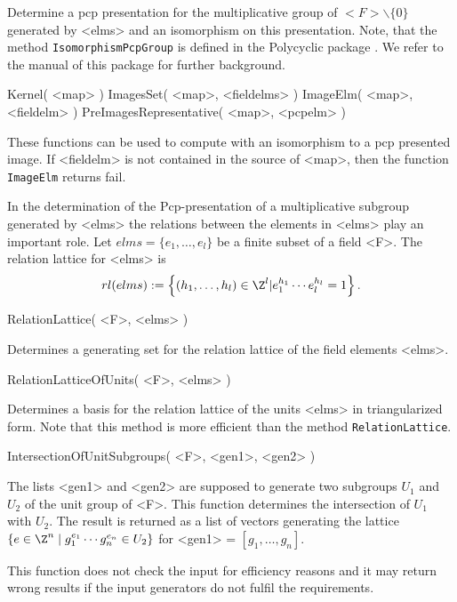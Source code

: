 Determine a pcp presentation for the multiplicative group of
$<F>\backslash\{0\}$ generated by
<elms> and an isomorphism on this presentation. 
Note, that the method {\tt IsomorphismPcpGroup} is defined in the
Polycyclic package \cite{Polycyclic}. We refer to the manual of this
package for further background. 


\> Kernel( <map> )
\> ImagesSet( <map>, <fieldelms> ) 
\> ImageElm( <map>, <fieldelm> )
\> PreImagesRepresentative( <map>, <pcpelm> )

These functions can be used to compute with an isomorphism to a pcp
presented image. If <fieldelm> is not contained in the source of
<map>,
then the function {\tt ImageElm} returns fail.

In the determination of the Pcp-presentation of a multiplicative
subgroup generated by <elms> the relations between the elements in
<elms> play an important role.
Let $elms=\{e_1,\dots,e_l\}$ be a finite subset of a field <F>.
The relation lattice for <elms> is 
$$
rl(elms):=\left\{(h_1,\dots,h_l) \in \Z^l | e_1^{h_1} \cdots
e_l^{h_l} = 1\right\} .
$$

\> RelationLattice( <F>, <elms> )

Determines a generating set 
for the relation lattice of the field elements <elms>.
 

\> RelationLatticeOfUnits( <F>, <elms> )

Determines a basis for the relation lattice of the units <elms> in 
triangularized form. Note that this method is more efficient than 
the method {\tt RelationLattice}.

\> IntersectionOfUnitSubgroups( <F>, <gen1>, <gen2> )

The lists <gen1> and <gen2> are supposed to generate two subgroups 
$U_1$ and $U_2$ of the unit group of <F>. This function determines 
the intersection of $U_1$ with $U_2$. The result is returned as a 
list of vectors generating the lattice $\{ e \in \Z^n \mid g_1^{e_1} 
\cdots g_n^{e_n} \in U_2 \}$ for <gen1> = $[g_1, \ldots, g_n]$.

This function does not check the input for efficiency reasons and it 
may return wrong results if the input generators do not fulfil the 
requirements.




